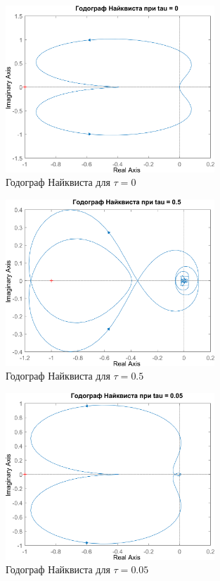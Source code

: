 \begin{figure}[H]
    \centering
    \centering
    \includegraphics[width=0.7\textwidth, trim={0cm 0cm 0cm 0cm}]{../images/3_2_0_hod.png}
    \caption{Годограф Найквиста для $\tau = 0$}
\end{figure}

\begin{figure}[H]
    \centering
    \centering
    \includegraphics[width=0.7\textwidth, trim={0cm 0cm 0cm 0cm}]{../images/3_2_1_hod.png}
    \caption{Годограф Найквиста для $\tau = 0.5$}
\end{figure}

\begin{figure}[H]
    \centering
    \centering
    \includegraphics[width=0.7\textwidth, trim={0cm 0cm 0cm 0cm}]{../images/3_2_2_hod.png}
    \caption{Годограф Найквиста для $\tau = 0.05$}
\end{figure}

